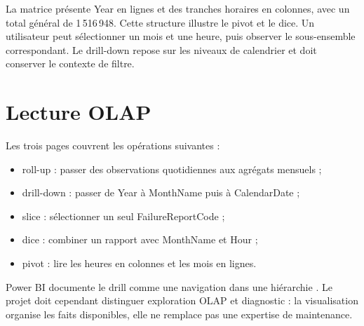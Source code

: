 La matrice présente Year en lignes et des tranches horaires en colonnes, avec un total général de 1\,516\,948. Cette structure illustre le pivot et le dice. Un utilisateur peut sélectionner un mois et une heure, puis observer le sous-ensemble correspondant. Le drill-down repose sur les niveaux de calendrier et doit conserver le contexte de filtre.

\section{Lecture OLAP}
Les trois pages couvrent les opérations suivantes :
\begin{itemize}
\item roll-up : passer des observations quotidiennes aux agrégats mensuels ;
\item drill-down : passer de Year à MonthName puis à CalendarDate ;
\item slice : sélectionner un seul FailureReportCode ;
\item dice : combiner un rapport avec MonthName et Hour ;
\item pivot : lire les heures en colonnes et les mois en lignes.
\end{itemize}
Power BI documente le drill comme une navigation dans une hiérarchie \cite{powerbiDrill}. Le projet doit cependant distinguer exploration OLAP et diagnostic : la visualisation organise les faits disponibles, elle ne remplace pas une expertise de maintenance.
